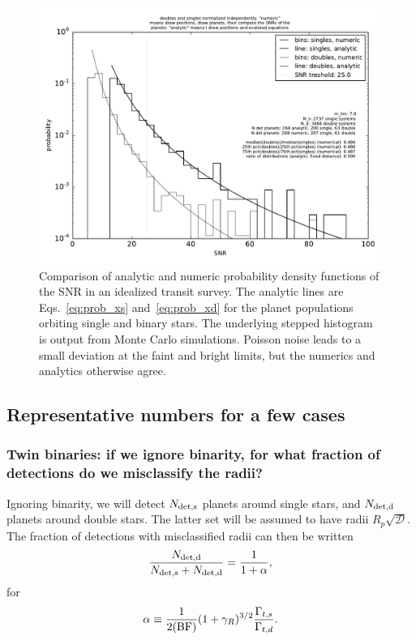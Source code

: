 \documentclass{emulateapj}
\begin{document}
\begin{figure}[!t]
	\begin{center}
		\includegraphics[scale=0.4]{figures/snr_distribution.pdf}
	\end{center}
	\caption{Comparison of analytic and numeric probability 
	density functions of the SNR in an idealized transit survey.
	The analytic lines are Eqs.~\ref{eq:prob_xs} and~\ref{eq:prob_xd} for the 
	planet populations orbiting single and binary stars. The underlying stepped 
	histogram is output from Monte Carlo simulations. Poisson noise leads to 
	a small deviation at the faint and bright limits, but the numerics and 
	analytics otherwise agree.
		 }
	\label{fig:snr_dist_analytic_v_numeric}
\end{figure}


\subsection{Representative numbers for a few cases}

\subsubsection{Twin binaries: if we ignore binarity, for what fraction of 
detections do we misclassify the radii?}
 
Ignoring binarity, we will detect $N_{\rm det,s}$ planets around single stars, 
and $N_{\rm det,d}$ planets around double stars. The latter set will be assumed 
to have radii $R_p \sqrt{\mathcal{D}}$.
The fraction of detections with misclassified radii can then be written
\begin{equation}
\frac{N_{\rm det,d}}{N_{\rm det,s} + N_{\rm det,d}} = \frac{1}{1+\alpha},
\end{equation}
for
\begin{equation}
\alpha \equiv \frac{1}{2({\rm BF})} (1+\gamma_R)^{3/2} 
\frac{\Gamma_{t,s}}{\Gamma_{t,d}}.
\end{equation}
\end{document}
